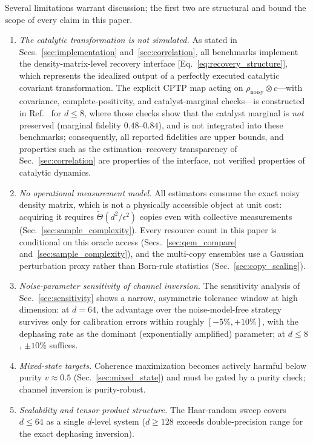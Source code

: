 \documentclass[12pt,a4paper]{article}
\newcommand{\rhon}{\rho_\mathrm{noisy}}
\begin{document}
Several limitations warrant discussion; the first two are structural and bound the scope of every claim in this paper.
\begin{enumerate}
\item \emph{The catalytic transformation is not simulated.}
As stated in Secs.~\ref{sec:implementation} and~\ref{sec:correlation}, all benchmarks implement the density-matrix-level recovery interface [Eq.~\eqref{eq:recovery_structure}], which represents the idealized output of a perfectly executed catalytic covariant transformation.
The explicit CPTP map acting on $\rhon \otimes c$---with covariance, complete-positivity, and catalyst-marginal checks---is constructed in Ref.~\cite{Wakaura2026unified} for $d \leq 8$, where those checks show that the catalyst marginal is \emph{not} preserved (marginal fidelity $0.48$--$0.84$), and is not integrated into these benchmarks; consequently, all reported fidelities are upper bounds, and properties such as the estimation--recovery transparency of Sec.~\ref{sec:correlation} are properties of the interface, not verified properties of catalytic dynamics.
\item \emph{No operational measurement model.}
All estimators consume the exact noisy density matrix, which is not a physically accessible object at unit cost: acquiring it requires $\tilde\Theta(d^2/\epsilon^2)$ copies even with collective measurements (Sec.~\ref{sec:sample_complexity}).
Every resource count in this paper is conditional on this oracle access (Secs.~\ref{sec:qem_compare} and~\ref{sec:sample_complexity}), and the multi-copy ensembles use a Gaussian perturbation proxy rather than Born-rule statistics (Sec.~\ref{sec:copy_scaling}).
\item \emph{Noise-parameter sensitivity of channel inversion.}
The sensitivity analysis of Sec.~\ref{sec:sensitivity} shows a narrow, asymmetric tolerance window at high dimension: at $d = 64$, the advantage over the noise-model-free strategy survives only for calibration errors within roughly $[-5\%, +10\%]$, with the dephasing rate as the dominant (exponentially amplified) parameter; at $d \leq 8$, $\pm 10\%$ suffices.
\item \emph{Mixed-state targets.}
Coherence maximization becomes actively harmful below purity $v \approx 0.5$ (Sec.~\ref{sec:mixed_state}) and must be gated by a purity check; channel inversion is purity-robust.
\item \emph{Scalability and tensor product structure.}
The Haar-random sweep covers $d \leq 64$ as a single $d$-level system ($d \geq 128$ exceeds double-precision range for the exact dephasing inversion).

\end{enumerate}
\end{document}
